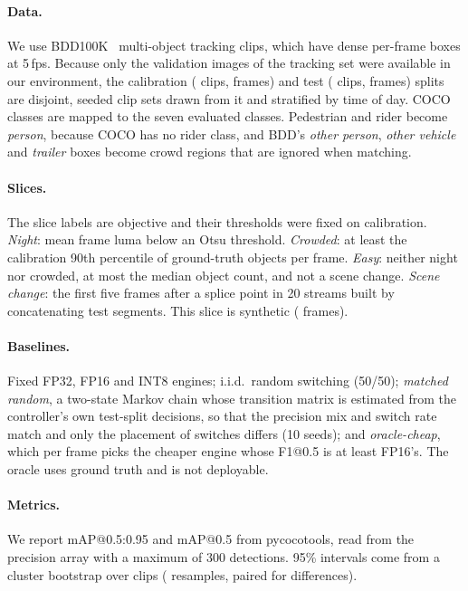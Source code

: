 \documentclass{svproc}
\begin{document}
\paragraph{Data.} We use BDD100K~\cite{bdd100k} multi-object tracking clips, which have dense per-frame boxes at 5\,fps.
Because only the validation images of the tracking set were available in our environment, the calibration
(\CalibClips{} clips, \FramesCalibAll{} frames) and test (\TestClips{} clips, \TestFrames{} frames) splits are disjoint, seeded clip sets drawn from it and stratified by time of day.
COCO classes are mapped to the seven evaluated classes. Pedestrian and rider become \emph{person}, because COCO has no rider class, and
BDD's \emph{other person}, \emph{other vehicle} and \emph{trailer} boxes become crowd regions that are ignored when matching.
\paragraph{Slices.} The slice labels are objective and their thresholds were fixed on calibration. \emph{Night}: mean frame luma below an Otsu threshold.
\emph{Crowded}: at least the calibration 90th percentile of ground-truth objects per frame. \emph{Easy}: neither night nor
crowded, at most the median object count, and not a scene change. \emph{Scene change}: the first five frames after a splice point in 20 streams
built by concatenating test segments. This slice is synthetic (\SceneChangeFrames{} frames).
\paragraph{Baselines.} Fixed FP32, FP16 and INT8 engines; i.i.d.\ random switching (50/50); \emph{matched random}, a
two-state Markov chain whose transition matrix is estimated from the controller's own test-split decisions, so that the precision mix and switch
rate match and only the placement of switches differs (10 seeds); and \emph{oracle-cheap}, which per frame picks the cheaper engine whose
F1@0.5 is at least FP16's. The oracle uses ground truth and is not deployable.
\paragraph{Metrics.} We report mAP@0.5:0.95 and mAP@0.5 from pycocotools, read from the precision array with a maximum of 300
detections. 95\% intervals come from a cluster bootstrap over clips (\BootResamples{} resamples, paired for differences).
\end{document}
